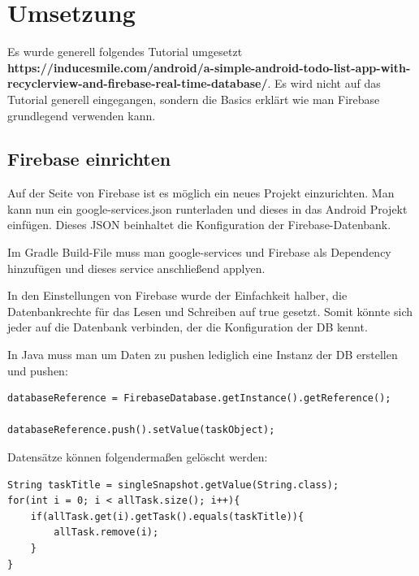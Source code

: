 \section{Umsetzung}
Es wurde generell folgendes Tutorial umgesetzt \textbf{https://inducesmile.com/android/a-simple-android-todo-list-app-with-recyclerview-and-firebase-real-time-database/}. Es wird nicht auf das Tutorial generell eingegangen, sondern die Basics erklärt wie man Firebase grundlegend verwenden kann.

\subsection{Firebase einrichten}
Auf der Seite von Firebase ist es möglich ein neues Projekt einzurichten. Man kann nun ein google-services.json runterladen und dieses in das Android Projekt einfügen. Dieses JSON beinhaltet die Konfiguration der Firebase-Datenbank.

Im Gradle Build-File muss man google-services und Firebase als Dependency hinzufügen und dieses service anschließend applyen.

In den Einstellungen von Firebase wurde der Einfachkeit halber, die Datenbankrechte für das Lesen und Schreiben auf true gesetzt. Somit könnte sich jeder auf die Datenbank verbinden, der die Konfiguration der DB kennt.

In Java muss man um Daten zu pushen lediglich eine Instanz der DB erstellen und pushen:
\begin{lstlisting}
databaseReference = FirebaseDatabase.getInstance().getReference();

databaseReference.push().setValue(taskObject);
\end{lstlisting}

Datensätze können folgendermaßen gelöscht werden:
\begin{lstlisting}
String taskTitle = singleSnapshot.getValue(String.class);
for(int i = 0; i < allTask.size(); i++){
	if(allTask.get(i).getTask().equals(taskTitle)){
		allTask.remove(i);
	}
}
\end{lstlisting}
